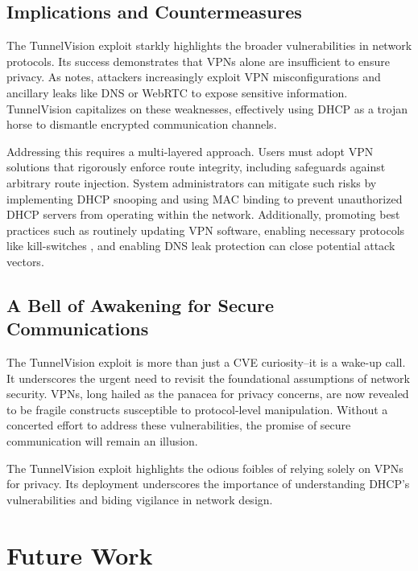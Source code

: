 \documentclass[conference]{IEEEtran}
\begin{document}
    \subsection{Implications and Countermeasures}
    \label{subsec:Implications_and_Countermeasures}

        The TunnelVision exploit starkly highlights the broader vulnerabilities in network protocols. Its success demonstrates that VPNs alone are insufficient to ensure privacy. As \cite{Abbas2023} notes, attackers increasingly exploit VPN misconfigurations and ancillary leaks like DNS or WebRTC to expose sensitive information. TunnelVision capitalizes on these weaknesses, effectively using DHCP as a trojan horse to dismantle encrypted communication channels.  

        Addressing this requires a multi-layered approach. Users must adopt VPN solutions that rigorously enforce route integrity, including safeguards against arbitrary route injection. System administrators can mitigate such risks by implementing DHCP snooping and using MAC binding to prevent unauthorized DHCP servers from operating within the network. Additionally, promoting best practices such as routinely updating VPN software, enabling necessary protocols like kill-switches \cite{NordVPN2024,ProtonVPN2024,ExpressVPN2024}, and enabling DNS leak protection can close potential attack vectors.  

    \subsection{A Bell of Awakening for Secure Communications}
    \label{subsec:A_Bell_of_Awakening}

        The TunnelVision exploit is more than just a CVE curiosity--it is a wake-up call. It underscores the urgent need to revisit the foundational assumptions of network security. VPNs, long hailed as the panacea for privacy concerns, are now revealed to be fragile constructs susceptible to protocol-level manipulation. Without a concerted effort to address these vulnerabilities, the promise of secure communication will remain an illusion.  

        The TunnelVision exploit highlights the odious foibles of relying solely on VPNs for privacy. Its deployment underscores the importance of understanding DHCP’s vulnerabilities and biding vigilance in network design.

\section{Future Work}
\label{sec:Future_Work}
\end{document}
